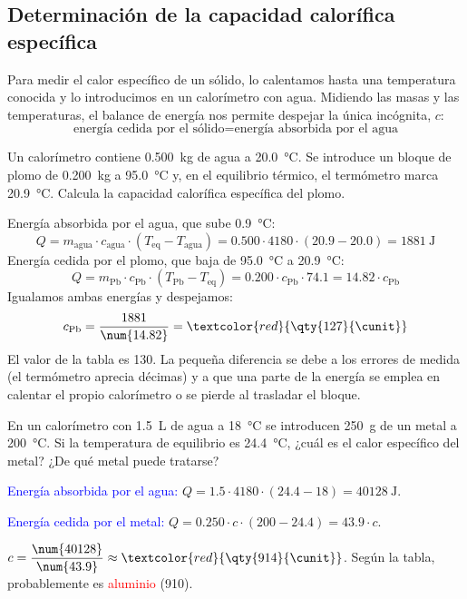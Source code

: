 \subsection{Determinación de la capacidad calorífica específica}

Para medir el calor específico de un sólido, lo calentamos hasta una temperatura conocida y lo introducimos en un calorímetro con agua. Midiendo las masas y las temperaturas, el balance de energía nos permite despejar la única incógnita, \(c\):
\[ \text{energía cedida por el sólido} = \text{energía absorbida por el agua} \]

\begin{example}
    Un calorímetro contiene \qty{0.500}{\kg} de agua a \qty{20.0}{\degreeCelsius}. Se introduce un bloque de plomo de \qty{0.200}{\kg} a \qty{95.0}{\degreeCelsius} y, en el equilibrio térmico, el termómetro marca \qty{20.9}{\degreeCelsius}. Calcula la capacidad calorífica específica del plomo.

    Energía absorbida por el agua, que sube \qty{0.9}{\degreeCelsius}:
    \[ Q = m_{\text{agua}} \cdot c_{\text{agua}} \cdot (T_{\text{eq}} - T_{\text{agua}}) = \num{0.500} \cdot 4180 \cdot (\num{20.9} - \num{20.0}) = \qty{1881}{\joule} \]
    Energía cedida por el plomo, que baja de \qty{95.0}{\degreeCelsius} a \qty{20.9}{\degreeCelsius}:
    \[ Q = m_{\text{Pb}} \cdot c_{\text{Pb}} \cdot (T_{\text{Pb}} - T_{\text{eq}}) = \num{0.200} \cdot c_{\text{Pb}} \cdot \num{74.1} = \num{14.82} \cdot c_{\text{Pb}} \]
    Igualamos ambas energías y despejamos:
    \[ c_{\text{Pb}} = \frac{1881}{\num{14.82}} = \textcolor{red}{\qty{127}{\cunit}} \]
    El valor de la tabla es \qty{130}{\cunit}. La pequeña diferencia se debe a los errores de medida (el termómetro aprecia décimas) y a que una parte de la energía se emplea en calentar el propio calorímetro o se pierde al trasladar el bloque.
\end{example}

\begin{exercise}
    En un calorímetro con \qty{1.5}{\liter} de agua a \qty{18}{\degreeCelsius} se introducen \qty{250}{\gram} de un metal a \qty{200}{\degreeCelsius}. Si la temperatura de equilibrio es \qty{24.4}{\degreeCelsius}, ¿cuál es el calor específico del metal? ¿De qué metal puede tratarse?
    \begin{solu}
        \textcolor{blue}{Energía absorbida por el agua:} \(Q = \num{1.5} \cdot 4180 \cdot (\num{24.4} - 18) = \qty{40128}{\joule}\).

        \textcolor{blue}{Energía cedida por el metal:} \(Q = \num{0.250} \cdot c \cdot (200 - \num{24.4}) = \num{43.9} \cdot c\).

        \(c = \dfrac{\num{40128}}{\num{43.9}} \approx \textcolor{red}{\qty{914}{\cunit}}\). Según la tabla, probablemente es \textcolor{red}{aluminio} (\qty{910}{\cunit}).
    \end{solu}
\end{exercise}

